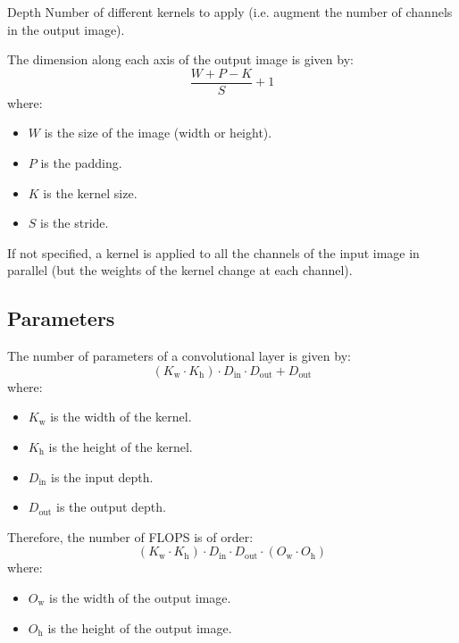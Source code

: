 \begin{description}
\begin{descriptionlist}
            \item[Depth] 
                Number of different kernels to apply (i.e. augment the number of channels in the output image).
        \end{descriptionlist}

        The dimension along each axis of the output image is given by:
        \[ \frac{W + P - K}{S} + 1 \]
        where:
        \begin{itemize}
            \item $W$ is the size of the image (width or height).
            \item $P$ is the padding.
            \item $K$ is the kernel size.
            \item $S$ is the stride.
        \end{itemize}

        \begin{remark}
            If not specified, a kernel is applied to all the channels of the input image in parallel (but the weights of the kernel change at each channel).
        \end{remark}
\end{description}


\subsection{Parameters}

The number of parameters of a convolutional layer is given by:
\[ (K_\text{w} \cdot K_\text{h}) \cdot D_\text{in} \cdot D_\text{out} + D_\text{out} \]
where:
\begin{itemize}
    \item $K_\text{w}$ is the width of the kernel.
    \item $K_\text{h}$ is the height of the kernel.
    \item $D_\text{in}$ is the input depth.
    \item $D_\text{out}$ is the output depth.
\end{itemize}

Therefore, the number of FLOPS is of order:
\[ (K_\text{w} \cdot K_\text{h}) \cdot D_\text{in} \cdot D_\text{out} \cdot (O_\text{w} \cdot O_\text{h}) \]
where:
\begin{itemize}
    \item $O_\text{w}$ is the width of the output image.
    \item $O_\text{h}$ is the height of the output image.
\end{itemize}



